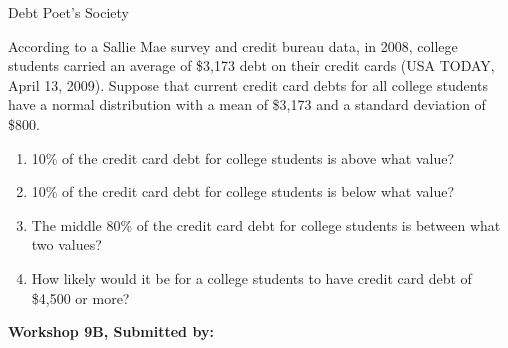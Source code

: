 \documentclass[11pt, chapterprefix=true]{scrbook}\usepackage[]{graphicx}\usepackage[]{color}
\begin{document}
\begin{exercises}
\begin{exercise}
Debt Poet’s Society

According to a Sallie Mae survey and credit bureau data, in 2008, college students carried an average of \$3,173 debt on their credit cards (USA TODAY, April 13, 2009). Suppose that current credit card debts for all college students have a normal distribution with a mean of \$3,173 and a standard deviation of \$800. 

\begin{enumerate}
  \item 10\% of the credit card debt for college students is above what value?
  \item 10\% of the credit card debt for college students is below what value?
  \item The middle 80\% of the credit card debt for college students is between what two values?
  \item How likely would it be for a college students to have credit card debt of \$4,500 or more?
\end{enumerate}

\end{exercise} 
\begin{solution}  %

\end{solution} 

\clearpage

    \begin{exercise}  %

    \begin{center}
\begin{flushleft}\textbf{\large \hfill Workshop 9B, Submitted by: }\end{flushleft}

\end{center}


\end{exercise}
\end{exercises}
\end{document}
